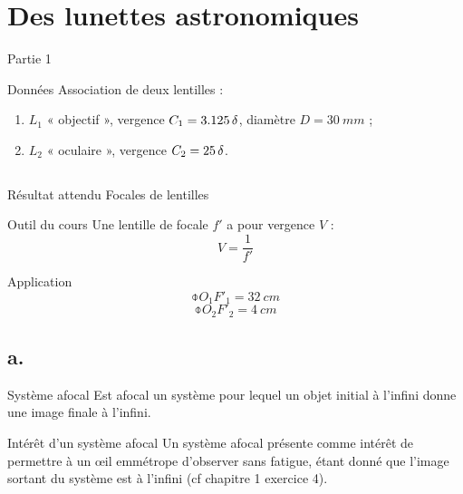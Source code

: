 \documentclass[10pt,a5paper,notitlepage]{book}
\begin{document}
\section{Des lunettes astronomiques}
\begin{center}
    \huge Partie 1
\end{center}

\pagebreak

\begin{NCdefi}{Données}
    Association de deux lentilles :
    \begin{enumerate}
        \item $L_1$ « objectif », vergence $C_1 = \SI{3.125}{\delta}$, diamètre $D
            = \SI{30}{mm}$ ;
        \item $L_2$ « oculaire », vergence $C_2 = \SI{25}{\delta}$.
    \end{enumerate}
\end{NCdefi}

\subsection{}

\begin{NCprop}{Résultat attendu}
    Focales de lentilles
\end{NCprop}

\begin{NCdemo}{Outil du cours}
    Une lentille de focale $f'$ a pour vergence $V$ :
    \[ V = \frac{1}{f'} \]
\end{NCdemo}

\begin{NCexem}{Application}
    \[ \boxed{\obar{O_1F'_1} = \SI{32}{cm}} \]
    \[ \boxed{\obar{O_2F'_2} = \SI{4}{cm}} \]
\end{NCexem}

\subsection{a.}
\begin{defi}{Système afocal}
    Est afocal un système pour lequel un objet initial à l'infini donne une
    image finale à l'infini.
\end{defi}

\begin{inte}{Intérêt d'un système afocal}
    Un système afocal présente comme intérêt de permettre à un œil emmétrope
    d'observer sans fatigue, étant donné que l'image sortant du système est à
    l'infini (cf chapitre 1 exercice 4).
\end{inte}
\end{document}
